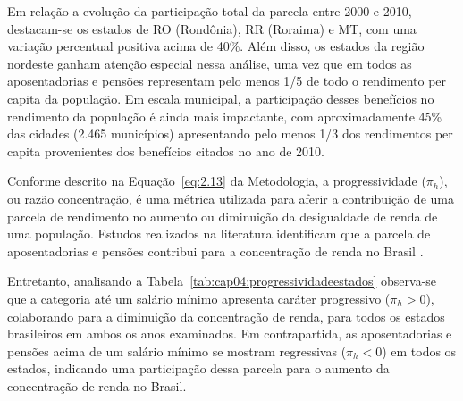 Em relação a evolução da participação total da parcela entre 2000 e 2010, destacam-se os estados de RO (Rondônia), RR (Roraima) e MT, com uma variação percentual positiva acima de 40\%. Além disso, os estados da região nordeste ganham atenção especial nessa análise, uma vez que em todos as aposentadorias e pensões representam pelo menos 1/5 de todo o rendimento per capita da população. Em escala municipal, a participação desses benefícios no rendimento da população é ainda mais impactante, com aproximadamente 45\% das cidades (2.465 municípios) apresentando pelo menos 1/3 dos rendimentos per capita provenientes dos benefícios citados no ano de 2010.  

Conforme descrito na Equação~\ref{eq:2.13} da Metodologia, a progressividade ($\pi_h$), ou razão concentração, é uma métrica utilizada para aferir a contribuição de uma parcela de rendimento no aumento ou diminuição da desigualdade de renda de uma população. Estudos realizados na literatura identificam que a parcela de aposentadorias e pensões contribui para a concentração de renda no Brasil \cite{cap02_ref22}.

Entretanto, analisando a Tabela~\ref{tab:cap04:progressividadeestados} observa-se que a categoria até um salário mínimo apresenta caráter progressivo ($\pi_h > 0$), colaborando para a diminuição da concentração de renda, para todos os estados brasileiros em ambos os anos examinados. Em contrapartida, as aposentadorias e pensões acima de um salário mínimo se mostram regressivas ($\pi_h < 0$) em todos os estados, indicando uma participação dessa parcela para o aumento da concentração de renda no Brasil.

